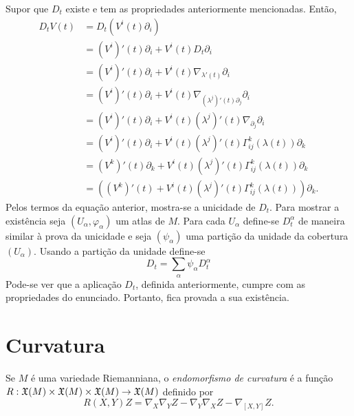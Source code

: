 \begin{demonstracao}
	Supor que $D_t$ existe e tem as propriedades anteriormente mencionadas.
	Então,
	\begin{align*}
		D_t V(t) &= D_t \left(V^i(t) \partial_i\right)\\
		&= (V^i)'(t) \partial_i + V^i(t) D_t \partial_i\\
		&= (V^i)'(t) \partial_i + V^i(t) \nabla_{\lambda'(t)} \partial_i\\
		&= (V^i)'(t) \partial_i + V^i(t) \nabla_{(\lambda^j)'(t) \partial_j} \partial_i\\
		&= (V^i)'(t) \partial_i + V^i(t) (\lambda^j)'(t)  \nabla_{\partial_j} \partial_i\\
		&= (V^i)'(t) \partial_i + V^i(t) (\lambda^j)'(t) \Gamma_{ij}^k(\lambda(t)) \partial_k\\
		&= (V^k)'(t) \partial_k + V^i(t) (\lambda^j)'(t) \Gamma_{ij}^k(\lambda(t)) \partial_k\\
		&= \left((V^k)'(t)  + V^i(t) (\lambda^j)'(t) \Gamma_{ij}^k(\lambda(t))\right) \partial_k.
	\end{align*}
	Pelos termos da equação anterior, mostra-se a unicidade de $D_t$.
	Para mostrar a existência
	seja $(U_{\alpha}, \varphi_{\alpha})$ um atlas de $M$.
	Para cada $U_{\alpha}$ define-se $D_t^{\alpha}$ de maneira similar à prova da unicidade e
	seja $(\psi_{\alpha})$ uma partição da unidade da cobertura $(U_{\alpha})$.
	Usando a partição da unidade define-se
	\begin{equation*}
		D_t = \sum_{\alpha} \psi_{\alpha} D_t^{\alpha}
	\end{equation*}
	Pode-se ver que a aplicação $D_t$, definida anteriormente, cumpre com as propriedades do enunciado.
	Portanto, fica provada a sua existência. 
\end{demonstracao}

\section{Curvatura}

\begin{definicao}
	Se $M$ é uma variedade Riemanniana, o \emph{endomorfismo de curvatura} é a função $R: \mathfrak{X}(M) \times \mathfrak{X}(M) \times \mathfrak{X}(M) \rightarrow \mathfrak{X}(M) $ definido por
	\begin{equation*}
		R(X,Y)Z = \nabla_X \nabla_Y Z - \nabla_Y \nabla_X Z - \nabla_{[X,Y]}Z.
	\end{equation*}
\end{definicao}

